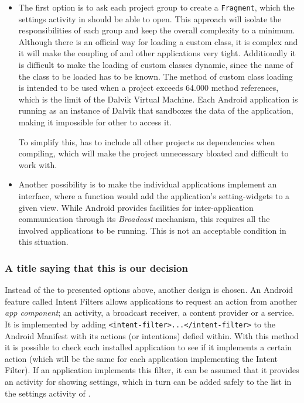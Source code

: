 \begin{itemize}
\item 
The first option is to ask each project group to create a \lstinline|Fragment|, which the settings activity in \launcher should be able to open.
This approach will isolate the responsibilities of each group and keep the overall complexity to a minimum.
Although there is an official way for loading a custom class\cite{customClassLoading}, it is complex and it will make the coupling of \launcher and other applications very tight.
Additionally it is difficult to make the loading of custom classes dynamic, since the name of the class to be loaded has to be known.
The method of custom class loading is intended to be used when a project exceeds 64.000 method references, which is the limit of the Dalvik Virtual Machine.
Each Android application is running as an instance of Dalvik that sandboxes the data of the application, making it impossible for other to access it.

To simplify this, \launcher has to include all other projects as dependencies when compiling, which will make the \launcher project unnecessary bloated and difficult to work with.

\item
Another possibility is to make the individual applications implement an interface, where a function would add the application's setting-widgets to a given view.
While Android provides facilities for inter-application communication through its \textit{Broadcast} mechanism\cite{broadcastReceiver}, this requires all the involved applications to be running.
This is not an acceptable condition in this situation. 
\end{itemize}
 
\subsubsection{A title saying that this is our decision}
Instead of the to presented options above, another design is chosen.
An Android feature called Intent Filters allows applications to request an action from another \textit{app component}; an activity, a broadcast receiver, a content provider or a service.
It is implemented by adding \lstinline|<intent-filter>...</intent-filter>| to the Android Manifest with its actions (or intentions) defied within.\cite{intentFilter}
With this method it is possible to check each installed application to see if it implements a certain action (which will be the same for each \giraf application implementing the Intent Filter).
If an application implements this filter, it can be assumed that it provides an activity for showing settings, which in turn can be added safely to the list in the settings activity of \launcher.

